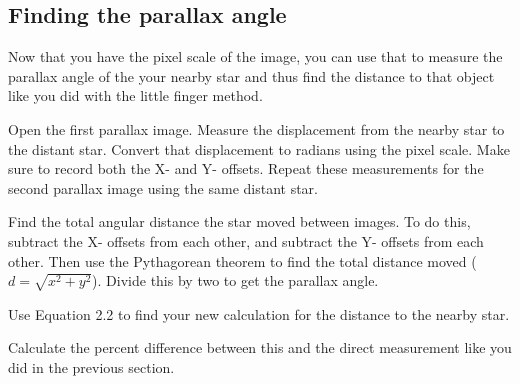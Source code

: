 \subsection{Finding the parallax angle}

Now that you have the pixel scale of the image, you can use that to measure the parallax angle of the your nearby star and thus find the distance to that object like you did with the little finger method.

\begin{steps}
	\item Open the first parallax image. Measure the displacement from the nearby star to the distant star. Convert that displacement to radians using the pixel scale. Make sure to record both the X- and Y- offsets. Repeat these measurements for the second parallax image using the same distant star.

	\item Find the total angular distance the star moved between images. To do this, subtract the X- offsets from each other, and subtract the Y- offsets from each other. Then use the Pythagorean theorem to find the total distance moved ($d = \sqrt{x^2 + y^2}$). Divide this by two to get the parallax angle.
	
	\item Use Equation 2.2 to find your new calculation for the distance to the nearby star.
	
	\item Calculate the percent difference between this and the direct measurement like you did in the previous section.
\end{steps}


%

